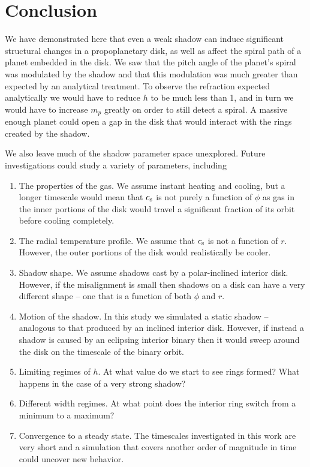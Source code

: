\documentclass[twocolumn]{aastex631}
\begin{document}
\pagebreak

\section{Conclusion}
\label{sec:conclusion}

We have demonstrated here that even a weak shadow can induce significant structural changes in a propoplanetary disk, as well as affect the spiral path of
a planet embedded in the disk. We saw that the pitch angle of the planet's spiral was modulated by the shadow and that this modulation
was much greater than expected by an analytical treatment. To observe the refraction expected analytically we would have to reduce $h$ to be much less than 1,
and in turn we would have to increase $m_p$ greatly on order to still detect a spiral. A massive enough planet could open a gap in the disk that would interact with
the rings created by the shadow.

We also leave much of the shadow parameter space unexplored. Future investigations could study a variety of parameters, including
\begin{enumerate}
    \item The properties of the gas. We assume instant heating and cooling, but a longer timescale would mean that $c_{\rm s}$ is not
        purely a function of $\phi$ as gas in the inner portions of the disk would travel a significant fraction of its orbit before cooling completely.
    \item The radial temperature profile. We assume that $c_{\rm s}$ is not a function of $r$. However, the outer portions of the disk would realistically
        be cooler.
    \item Shadow shape. We assume shadows cast by a polar-inclined interior disk. However, if the misalignment is small then shadows on a disk can have a very different
        shape -- one that is a function of both $\phi$ and $r$.
    \item Motion of the shadow. In this study we simulated a static shadow -- analogous to that produced by an inclined interior disk. However,
        if instead a shadow is caused by an eclipsing interior binary then it would sweep around the disk on the timescale of the binary orbit.
    \item Limiting regimes of $h$. At what value do we start to see rings formed? What happens in the case of a very strong shadow?
    \item Different width regimes. At what point does the interior ring switch from a minimum to a maximum?
    \item Convergence to a steady state. The timescales investigated in this work are very short and a simulation
        that covers another order of magnitude in time could uncover new behavior.
\end{enumerate}
\end{document}
